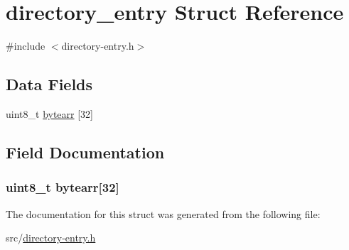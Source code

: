 \hypertarget{structdirectory__entry}{\section{directory\-\_\-entry Struct Reference}
\label{structdirectory__entry}
}


{\ttfamily \#include $<$directory-\/entry.\-h$>$}

\subsection*{Data Fields}
\begin{DoxyCompactItemize}
\item 
uint8\-\_\-t \hyperlink{structdirectory__entry_a380aef5511e7e06c9677a3ef970b32bc}{bytearr} \mbox{[}32\mbox{]}
\end{DoxyCompactItemize}


\subsection{Field Documentation}
\hypertarget{structdirectory__entry_a380aef5511e7e06c9677a3ef970b32bc}{
\subsubsection[{bytearr}]{\setlength{\rightskip}{0pt plus 5cm}uint8\-\_\-t bytearr\mbox{[}32\mbox{]}}}\label{structdirectory__entry_a380aef5511e7e06c9677a3ef970b32bc}


The documentation for this struct was generated from the following file\-:\begin{DoxyCompactItemize}
\item 
src/\hyperlink{directory-entry_8h}{directory-\/entry.\-h}\end{DoxyCompactItemize}
